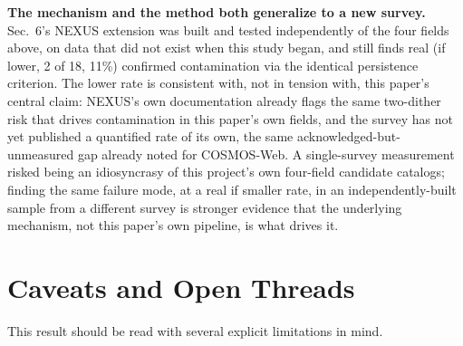 \documentclass[11pt]{article}
\begin{document}
\textbf{The mechanism and the method both generalize to a new survey.} Sec.~6's
NEXUS extension was built and tested independently of the four fields above, on
data that did not exist when this study began, and still finds real (if lower,
2 of 18, 11\%) confirmed contamination via the identical persistence criterion.
The lower rate is consistent with, not in tension with, this paper's central
claim: NEXUS's own documentation already flags the same two-dither risk that
drives contamination in this paper's own fields, and the survey has not yet
published a quantified rate of its own, the same acknowledged-but-unmeasured
gap already noted for COSMOS-Web. A single-survey measurement risked being an
idiosyncrasy of this project's own four-field candidate catalogs; finding the
same failure mode, at a real if smaller rate, in an independently-built sample
from a different survey is stronger evidence that the underlying mechanism, not
this paper's own pipeline, is what drives it.

\section{Caveats and Open Threads}

This result should be read with several explicit limitations in mind.
\end{document}
